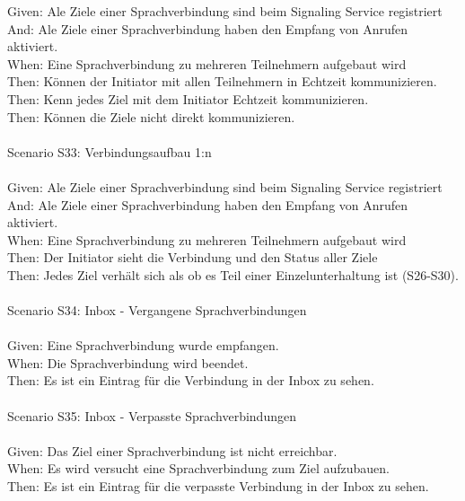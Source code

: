 \begin{tabbing}
    Given:  \> \> \> Ale Ziele einer Sprachverbindung sind beim Signaling Service registriert\\
    And:  \> \> \> Ale Ziele einer Sprachverbindung haben den Empfang von Anrufen aktiviert.\\
    When:   \> \> \> Eine Sprachverbindung zu mehreren Teilnehmern aufgebaut wird\\
    Then:   \> \> \> Können der Initiator mit allen Teilnehmern in Echtzeit kommunizieren.\\
    Then:   \> \> \> Kenn jedes Ziel mit dem Initiator Echtzeit kommunizieren.\\
    Then:   \> \> \> Können die Ziele nicht direkt kommunizieren.\\
    \\
    Scenario S33: \> \> \> Verbindungsaufbau 1:n  \\ \\
    Given:  \> \> \> Ale Ziele einer Sprachverbindung sind beim Signaling Service registriert\\
    And:  \> \> \> Ale Ziele einer Sprachverbindung haben den Empfang von Anrufen aktiviert.\\
    When:   \> \> \> Eine Sprachverbindung zu mehreren Teilnehmern aufgebaut wird\\
    Then:   \> \> \> Der Initiator sieht die Verbindung und den Status aller Ziele \\
    Then:   \> \> \> Jedes Ziel verhält sich als ob es Teil einer Einzelunterhaltung ist (S26-S30).\\
    \\
    Scenario S34: \> \> \> Inbox - Vergangene Sprachverbindungen \\ \\
    Given:  \> \> \> Eine Sprachverbindung wurde empfangen. \\
    When:   \> \> \> Die Sprachverbindung wird beendet.  \\
    Then:   \> \> \> Es ist ein Eintrag für die Verbindung in der Inbox zu sehen. \\
    \\
    Scenario S35: \> \> \> Inbox - Verpasste Sprachverbindungen \\ \\
    Given:  \> \> \> Das Ziel einer Sprachverbindung ist nicht erreichbar. \\
    When:   \> \> \> Es wird versucht eine Sprachverbindung zum Ziel aufzubauen.\\
    Then:   \> \> \> Es ist ein Eintrag für die verpasste Verbindung in der Inbox zu sehen.\\

\end{tabbing}
